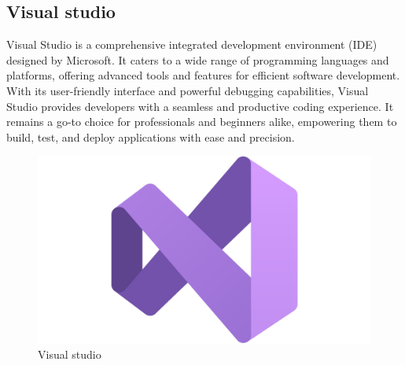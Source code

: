 \documentclass[12pt]{book}
\begin{document}
\subsection{Visual studio}
Visual Studio is a comprehensive integrated development environment (IDE) designed by Microsoft. It caters to a wide range of programming languages and platforms, offering advanced tools and features for efficient software development. With its user-friendly interface and powerful debugging capabilities, Visual Studio provides developers with a seamless and productive coding experience. It remains a go-to choice for professionals and beginners alike, empowering them to build, test, and deploy applications with ease and precision.
\begin{figure}[!h]
    \centering
    \includegraphics[scale=0.03]{./Figures/Images/Visual-Studio-logo.png}
    \caption{Visual studio}
    \label{Visual studio}
\end{figure}
\end{document}
